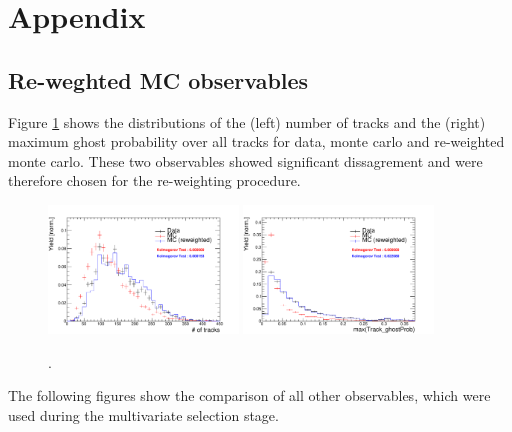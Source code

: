 \section{Appendix}
\label{sec: appendix}

\subsection{Re-weghted MC observables}
\label{sec: mcvdata}
Figure \ref{fig: reweightingVar} shows the distributions of the (left) number of tracks and the (right) maximum ghost probability over all tracks for data, monte carlo and re-weighted monte carlo.
These two observables showed significant dissagrement and were therefore chosen for the re-weighting procedure.

\begin{figure}[ht!]
\includegraphics[height=6.cm,width=0.45\textwidth]{figs/MC-v-Data/nTracks.pdf}
\includegraphics[height=6.cm,width=0.45\textwidth]{figs/MC-v-Data/max_ghostProb.pdf}
\label{fig: reweightingVar}
\caption{.}
\end{figure}

The following figures show the comparison of all other observables, which were used during the multivariate selection stage.


